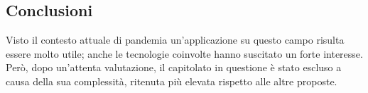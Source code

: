 \subsection{Conclusioni}
Visto il contesto attuale di pandemia un'applicazione su questo campo risulta essere molto utile; anche le tecnologie coinvolte hanno suscitato un forte interesse. Però, dopo un'attenta valutazione, il capitolato in questione è stato escluso a causa della sua complessità, ritenuta più elevata rispetto alle altre proposte. 
